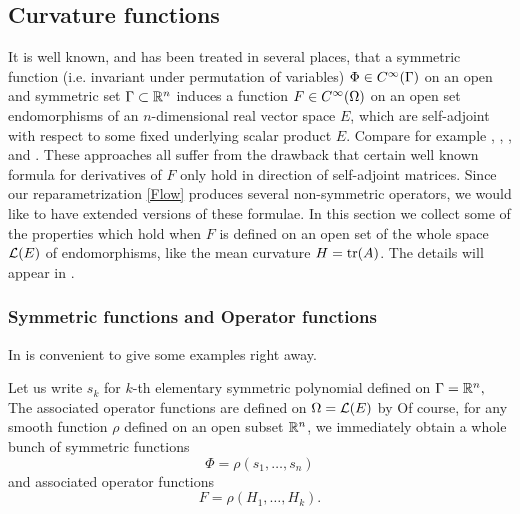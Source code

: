 \subsection*{Curvature functions}
It is well known, and has been treated in several places, that a symmetric function (i.e. invariant under permutation of variables) $\Phi\in C^{\infty}(\Gamma)$ on an open and symmetric set $\Gamma\subset\mathbb{R}^{n}$ induces a function $F\in C^{\infty}(\Omega)$ on an open set endomorphisms of an $n$-dimensional real vector space $E$, which are self-adjoint with respect to some fixed underlying scalar product $E$. Compare for example \cite{CaffarelliNirenbergSpruck:12/1985}, \cite{Andrews:/1994b}, \cite{Andrews:/2007}, and \cite{Gerhardt:/2006}. These approaches all suffer from the drawback that certain well known formula for derivatives of $F$ only hold in direction of self-adjoint matrices. Since our reparametrization \eqref{Flow} produces several non-symmetric operators, we would like to have extended versions of these formulae. In this section we collect some of the properties which hold when $F$ is defined on an open set of the whole space $\mathcal{L}(E)$ of endomorphisms, like the mean curvature $H=\operatorname{tr}(A)$. The details will appear in \cite{Scheuer:/2017}.

\subsubsection*{Symmetric functions and Operator functions}

{}

In is convenient to give some examples right away.

\begin{example}
Let us write $s_k$ for $k$-th elementary symmetric polynomial defined on $\Gamma=\mathbb{R}^{n},$
 The associated operator functions are defined on $\Omega=\mathcal{L}(E)$ by
Of course, for any smooth function $\rho$ defined on an open subset $\mathbb{R}^{n}$, we immediately obtain a whole bunch of symmetric functions
$$\Phi=\rho(s_{1},\dots,s_{n})$$
 and associated operator functions
$$F=\rho(H_{1},\dots,H_{k}).$$
\end{example}

